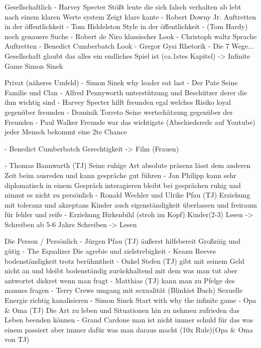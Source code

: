 Gesellschaftlich
    - Harvey Specter
        Stößt leute die sich falsch verhalten ab 
        lebt nach einem klaren Werte system 
        Zeigt klare kante 
    - Robert Downy Jr.
        Auftretten in der öffentlichkeit 
    - Tom Hiddelston
        Style in der öffentlichkeit
    - (Tom Hardy)
        noch genauere Suche
    - Robert de Niro
        klassischer Look
    - Christoph waltz 
        Sprache 
        Auftretten
    - Benedict Cumberbatch
        Look
    - Gregor Gysi
        Rhetorik 
    - Die 7 Wege...
        Gesellschaft glaubt das alles ein endliches Spiel ist (ca.1stes Kapitel) -> Infinite Game Simon Sinek

        

Privat (näheres Umfeld)
    - Simon Sinek 
        why leader eat last
    - Der Pate
        Seine Familie und Clan
    - Alfred Pennyworth
        unterstützung und Beschützer derer die ihm wichtig sind 
    - Harvey Specter
        hilft freunden egal welches Risiko
        loyal gegenüber freunden 
    - Dominik Torreto
        Seine wertschätzung gegenüber der Freunden
    - Paul Walker
        Freunde war das wichtigste (Abschiedsrede auf Youtube)
        jeder Mensch bekommt eine 2te Chance 

    - Benedict Cumberbatch
        Gerechtigkeit -> Film (Frauen)
   
    - Thomas Bannwarth (TJ)
        Seine ruhige Art
        absolute präsenz
        lässt dem anderen Zeit beim ausreden und kann gespräche gut führen 
    - Jan Philipp 
        kann sehr diplomatisch in einem Gespräch interagieren 
        bleibt bei gesprächen ruhig und nimmt es nicht zu persönlich 
    - Ronald Wechler und Ulrike Pfau (TJ)
        Erziehung mit toleranz und akzeptans
        Kinder auch eigenständigkeit überlassen und freiraum für fehler und reife
    - Erziehung 
        Birkenbihl (stroh im Kopf)
            Kinder(2-3) Lesen -> Schreiben
            ab 5-6 Jahre Schreiben -> Lesen
    

Die Person / Persönlich
    - Jürgen Pfau (TJ)
        äußerst hilfsbereit 
        Großzüig und gütig
    - The Equalizer
        Die agrebie und zielstrebigkeit 
    - Keanu Reeves 
        bodenständigkeit trotz berühmtheit
    - Onkel Stefen (TJ)
        gibt mit seinem Geld nicht an und bleibt bodenständig
        zurückhaltend mit dem was man tut aber antwortet diskret wenn man fragt
    - Matthias (TJ)
        kann man zu Pfelge des mannes fragen 
    - Terry Crews
        umgang mit sexualität 
    (Blinkist Buch) Sexuelle Energie richtig kanalisieren
    - Simon Sinek 
        Start with why 
        the infinite game
    - Opa & Oma (TJ)
        Die Art zu leben und Situationen hin zu nehmen
        zufrieden das Leben beenden können 
    - Grand Cardone
        man ist nicht immer schuld für das was einem passiert aber immer dafür was man daraus macht (10x Rule)(Opa & Oma von TJ)

